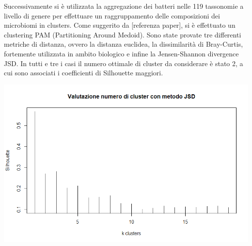Successivamente si è utilizzata la aggregazione dei batteri nelle 119 tassonomie a livello di genere per effettuare un raggruppamento delle composizioni dei microbiomi in clusters. Come suggerito da [referenza paper], si è effettuato un clustering PAM (Partitioning Around Medoid).
Sono state provate tre differenti metriche di distanza, ovvero la distanza euclidea, la dissimilarità di Bray-Curtis, fortemente utilizzata in ambito biologico e infine la Jensen-Shannon divergence JSD. In tutti e tre i casi il numero ottimale di cluster da considerare è stato 2, a cui sono associati i coefficienti di Silhouette maggiori. 
\vspace*{1cm}
\begin{Figure}
    \centering
    \includegraphics[width=\linewidth,keepaspectratio]{images/silhouette.png}
  \end{Figure}
 \vspace*{1cm}
  
